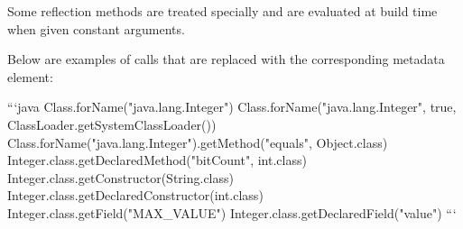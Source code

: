 Some reflection methods are treated specially and are evaluated at build time when given constant arguments.

Below are examples of calls that are replaced with the corresponding metadata element:

```java
Class.forName("java.lang.Integer")
Class.forName("java.lang.Integer", true, ClassLoader.getSystemClassLoader())
Class.forName("java.lang.Integer").getMethod("equals", Object.class)
Integer.class.getDeclaredMethod("bitCount", int.class)
Integer.class.getConstructor(String.class)
Integer.class.getDeclaredConstructor(int.class)
Integer.class.getField("MAX\_VALUE")
Integer.class.getDeclaredField("value")
```
